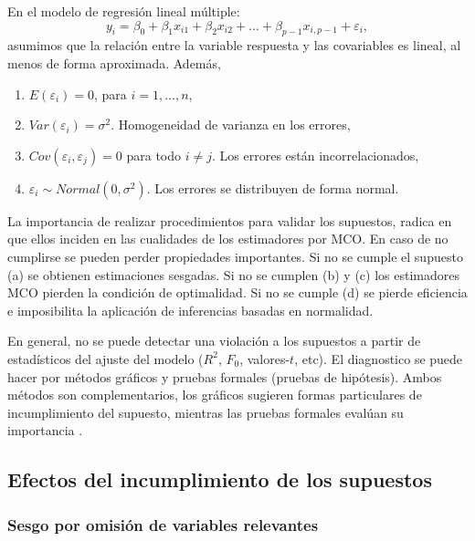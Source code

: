 \documentclass[
]{article}
\providecommand{\tightlist}{%
  \setlength{\itemsep}{0pt}\setlength{\parskip}{0pt}}
\begin{document}
En el modelo de regresión lineal múltiple:
\[
y_{i}=\beta_{0} + \beta_{1} x_{i1}+\beta_{2} x_{i2}+\ldots + \beta_{p-1} x_{i,p-1} +\varepsilon_{i},
\]
asumimos que la relación entre la variable respuesta y las covariables es lineal, al menos de forma aproximada. Además,

\begin{enumerate}
\def\labelenumi{\alph{enumi}.}
\tightlist
\item
  \(E(\varepsilon_{i})=0\), para \(i=1,\ldots,n\),
\item
  \(Var(\varepsilon_{i})=\sigma^{2}\). Homogeneidad de varianza en los errores,
\item
  \(Cov(\varepsilon_{i},\varepsilon_{j})=0\) para todo \(i\neq j\). Los errores están incorrelacionados,
\item
  \(\varepsilon_{i} \sim Normal(0, \sigma^{2})\). Los errores se distribuyen de forma normal.
\end{enumerate}

La importancia de realizar procedimientos para validar los supuestos, radica en que ellos inciden en las cualidades de los estimadores por MCO. En caso de no cumplirse se pueden perder propiedades importantes. Si no se cumple el supuesto (a) se obtienen estimaciones sesgadas. Si no se cumplen (b) y (c) los estimadores MCO pierden la condición de optimalidad. Si no se cumple (d) se pierde eficiencia e imposibilita la aplicación de inferencias basadas en normalidad.

En general, no se puede detectar una violación a los supuestos a partir de estadísticos del ajuste del modelo (\(R^2\), \(F_0\), valores-\(t\), etc). El diagnostico se puede hacer por métodos gráficos y pruebas formales (pruebas de hipótesis). Ambos métodos son complementarios, los gráficos sugieren formas particulares de incumplimiento del supuesto, mientras las pruebas formales evalúan su importancia \citep{behar_validacion_2002}.

\hypertarget{efectos-del-incumplimiento-de-los-supuestos}{%
\subsection{Efectos del incumplimiento de los supuestos}\label{efectos-del-incumplimiento-de-los-supuestos}}

\hypertarget{sesgo-por-omisiuxf3n-de-variables-relevantes}{%
\subsubsection{Sesgo por omisión de variables relevantes}\label{sesgo-por-omisiuxf3n-de-variables-relevantes}}
\end{document}
